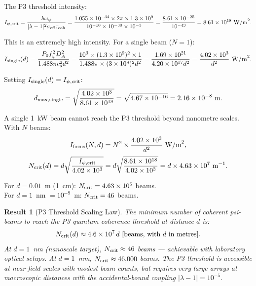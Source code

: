 \documentclass[aps,prd,twocolumn,superscriptaddress]{revtex4-2}
\newtheorem{result}{Result}
\begin{document}
The P3 threshold intensity:
\begin{equation}
I_{\psi,\rm crit} = \frac{\hbar\omega_\psi}{|\lambda-1|^2 \sigma_{\rm eff}\tau_{\rm coh}}
= \frac{1.055\times10^{-34}\times2\pi\times1.3\times10^9}
  {10^{-10}\times10^{-30}\times10^{-3}}
= \frac{8.61\times10^{-25}}{10^{-43}}
= 8.61\times10^{18}~\text{W/m}^2.
\label{eq:I-crit-num}
\end{equation}

This is an extremely high intensity.  For a single beam ($N=1$):
\begin{equation}
I_{\rm single}(d) = \frac{P_0 f_\psi^2 D_A^2}{1.488\pi c_s^2 d^2}
= \frac{10^3 \times (1.3\times10^9)^2 \times 1}{1.488\pi\times(3\times10^8)^2 d^2}
= \frac{1.69\times10^{21}}{4.20\times10^{17} d^2}
= \frac{4.02\times10^3}{d^2}~\text{W/m}^2.
\label{eq:I-single}
\end{equation}

Setting $I_{\rm single}(d) = I_{\psi,\rm crit}$:
\begin{equation}
d_{\rm max,single} = \sqrt{\frac{4.02\times10^3}{8.61\times10^{18}}}
= \sqrt{4.67\times10^{-16}} = 2.16\times10^{-8}~\text{m}.
\end{equation}

A single 1~kW beam cannot reach the P3 threshold beyond nanometre
scales.  With $N$ beams:
\begin{equation}
I_{\rm focus}(N,d) = N^2 \times \frac{4.02\times10^3}{d^2}~\text{W/m}^2,
\end{equation}
\begin{equation}
N_{\rm crit}(d) = d\sqrt{\frac{I_{\psi,\rm crit}}{4.02\times10^3}}
= d\sqrt{\frac{8.61\times10^{18}}{4.02\times10^3}}
= d \times 4.63\times10^7~\text{m}^{-1}.
\label{eq:N-crit-num}
\end{equation}

For $d = 0.01$~m (1~cm): $N_{\rm crit} = 4.63\times10^5$ beams. \\
For $d = 1$~nm $= 10^{-9}$~m: $N_{\rm crit} = 46$ beams.

\begin{result}[P3 Threshold Scaling Law]
The minimum number of coherent psi-beams to reach the P3 quantum
coherence threshold at distance $d$ is:
\begin{equation}
N_{\rm crit}(d) \approx 4.6\times10^7\,d~[\text{beams, with }d\text{ in metres}].
\end{equation}
At $d = 1$~nm (nanoscale target), $N_{\rm crit} \approx 46$ beams ---
achievable with laboratory optical setups.  At $d = 1$~mm,
$N_{\rm crit} \approx 46{,}000$ beams.  The P3 threshold is accessible
at near-field scales with modest beam counts, but requires very large
arrays at macroscopic distances with the accidental-bound coupling
$|\lambda-1| = 10^{-5}$.
\end{result}
\end{document}
